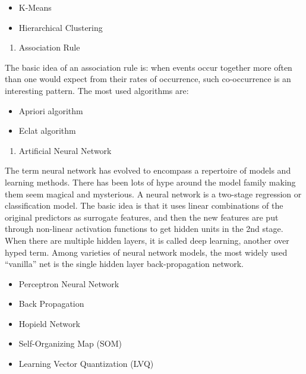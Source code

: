 \documentclass[12pt,]{krantz}
\providecommand{\tightlist}{%
  \setlength{\itemsep}{0pt}\setlength{\parskip}{0pt}}
\theoremstyle{definition}
\theoremstyle{definition}
\theoremstyle{definition}
\theoremstyle{remark}
\begin{document}
\begin{itemize}
\tightlist
\item
  K-Means
\item
  Hierarchical Clustering
\end{itemize}

\begin{enumerate}
\def\labelenumi{\arabic{enumi}.}
\setcounter{enumi}{8}
\tightlist
\item
  Association Rule
\end{enumerate}

The basic idea of an association rule is: when events occur together
more often than one would expect from their rates of occurrence, such
co-occurrence is an interesting pattern. The most used algorithms are:

\begin{itemize}
\tightlist
\item
  Apriori algorithm
\item
  Eclat algorithm
\end{itemize}

\begin{enumerate}
\def\labelenumi{\arabic{enumi}.}
\setcounter{enumi}{9}
\tightlist
\item
  Artificial Neural Network
\end{enumerate}

The term neural network has evolved to encompass a repertoire of models
and learning methods. There has been lots of hype around the model
family making them seem magical and mysterious. A neural network is a
two-stage regression or classification model. The basic idea is that it
uses linear combinations of the original predictors as surrogate
features, and then the new features are put through non-linear
activation functions to get hidden units in the 2nd stage. When there
are multiple hidden layers, it is called deep learning, another over
hyped term. Among varieties of neural network models, the most widely
used ``vanilla'' net is the single hidden layer back-propagation
network.

\begin{itemize}
\tightlist
\item
  Perceptron Neural Network
\item
  Back Propagation
\item
  Hopield Network
\item
  Self-Organizing Map (SOM)
\item
  Learning Vector Quantization (LVQ)
\end{itemize}
\end{document}
